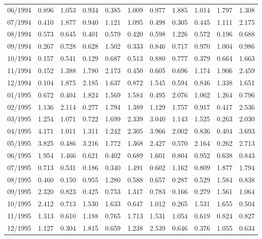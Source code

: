 \begin{tabular}{lrrrrrrrrrr}
06/1994 &  0.896 &  1.053 &  0.934 &  0.385 &  1.009 &  0.977 &  1.885 &  1.014 &  1.797 &  1.308 \\
07/1994 &  0.410 &  1.877 &  0.940 &  1.121 &  1.095 &  0.498 &  0.305 &  0.445 &  1.111 &  2.175 \\
08/1994 &  0.573 &  0.645 &  0.401 &  0.579 &  0.420 &  0.598 &  1.226 &  0.572 &  0.196 &  0.688 \\
09/1994 &  0.267 &  0.728 &  0.628 &  1.502 &  0.333 &  0.846 &  0.717 &  0.970 &  1.004 &  0.986 \\
10/1994 &  0.157 &  0.541 &  0.129 &  0.687 &  0.513 &  0.880 &  0.777 &  0.379 &  0.664 &  1.663 \\
11/1994 &  0.152 &  1.388 &  1.780 &  2.173 &  0.450 &  0.605 &  0.696 &  1.174 &  1.906 &  2.459 \\
12/1994 &  0.104 &  1.875 &  2.185 &  1.637 &  0.872 &  1.545 &  0.594 &  0.846 &  1.338 &  1.651 \\
01/1995 &  0.672 &  0.404 &  1.824 &  1.569 &  1.584 &  0.495 &  2.076 &  1.062 &  1.264 &  0.796 \\
02/1995 &  1.136 &  2.114 &  0.277 &  1.794 &  1.389 &  1.129 &  1.757 &  0.917 &  0.417 &  2.536 \\
03/1995 &  1.254 &  1.071 &  0.722 &  1.699 &  2.339 &  3.040 &  1.143 &  1.525 &  0.263 &  2.030 \\
04/1995 &  4.171 &  1.011 &  1.311 &  1.242 &  2.305 &  3.966 &  2.002 &  0.836 &  0.404 &  3.693 \\
05/1995 &  3.825 &  0.486 &  3.216 &  1.772 &  1.368 &  2.427 &  0.570 &  2.164 &  0.262 &  2.713 \\
06/1995 &  1.954 &  1.466 &  0.621 &  0.402 &  0.689 &  1.601 &  0.804 &  0.952 &  0.638 &  0.843 \\
07/1995 &  0.713 &  0.531 &  0.186 &  0.340 &  1.491 &  0.602 &  1.162 &  0.809 &  1.877 &  1.794 \\
08/1995 &  0.460 &  0.150 &  0.955 &  1.280 &  0.588 &  0.657 &  0.287 &  0.529 &  1.584 &  0.838 \\
09/1995 &  2.320 &  0.823 &  0.425 &  0.753 &  1.317 &  0.783 &  0.166 &  0.279 &  1.561 &  1.064 \\
10/1995 &  2.412 &  0.713 &  1.530 &  1.633 &  0.647 &  1.012 &  0.265 &  1.531 &  1.655 &  0.504 \\
11/1995 &  1.313 &  0.610 &  1.188 &  0.765 &  1.713 &  1.531 &  1.054 &  0.619 &  0.824 &  0.827 \\
12/1995 &  1.127 &  0.304 &  1.815 &  0.659 &  1.238 &  2.539 &  0.646 &  0.376 &  1.055 &  0.634 \\

\end{tabular}
